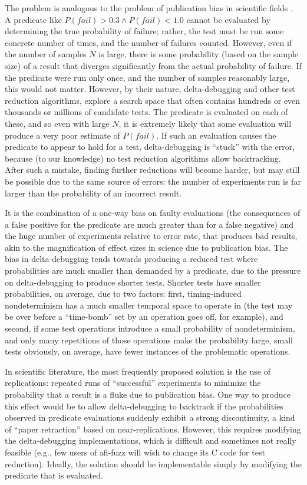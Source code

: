 The problem is analogous to the problem of publication bias in
scientific fields \cite{ahmed2012assessment}.  A predicate like
$P(fail) > 0.3 \wedge P(fail) < 1.0$ cannot be evaluated by
determining the true probability of failure; rather, the test must be
run some concrete number of times, and the number of failures counted.
However, even if the number of samples $N$ is large, there is some
probability (based on the sample size) of a result that diverges
significantly from the actual probability of failure.  If the
predicate were run only once, and the number of samples reasonably
large, this would not matter.  However, by their nature,
delta-debugging and other test reduction algorithms, explore a search
space that often contains hundreds or even thousands or millions of
candidate tests.  The predicate is evaluated on each of these, and so
even with large $N$, it is extremely likely that some evaluation will
produce a very poor estimate of $P(fail)$.  If such an evaluation
causes the predicate to appear to hold for a test, delta-debugging is
``stuck'' with the error, because (to our knowledge) no test reduction
algorithms allow backtracking.  After such a mistake, finding further
reductions will become harder, but may still be possible due to the
same source of errors:  the number of experiments run is far larger
than the probability of an incorrect result.



It is the combination of
a one-way bias on faulty evaluations (the consequences of a false
positive for the predicate are much greater than for a false negative)
and the huge number of experiments relative to error rate, that
produces bad results, akin to the magnification of effect sizes
in science due to publication bias.  The bias in delta-debugging tends
towards producing a reduced test where probabilities are much smaller
than demanded by a predicate, due to the pressure on delta-debugging
to produce shorter tests.  Shorter tests have smaller probabilities,
on average, due to two factors:  first, timing-induced nondeterminism
has a much smaller temporal space to operate in (the test may be over
before a ``time-bomb'' set by an operation goes off, for example), and second, if some
test operations introduce a small probability of nondeterminism, and
only many repetitions of those operations make the probability large,
small tests obviously, on average, have fewer instances of the
problematic operations.

In scientific literature, the most frequently proposed solution is the
use of replications:  repeated runs of ``successful'' experiments to
minimize the probability that a result is a fluke due to publication
bias.  One way to produce this effect would be to allow
delta-debugging to backtrack if the probabilities observed in predicate
evaluations suddenly exhibit a strong discontinuity, a kind of ``paper
retraction'' based on near-replications.  However, this requires
modifying the delta-debugging implementations, which is difficult and
sometimes not really feasible (e.g., few users of afl-fuzz \cite{aflfuzz} will wish
to change its C code for test reduction).  Ideally, the solution
should be implementable simply by modifying the predicate that is
evaluated.  

